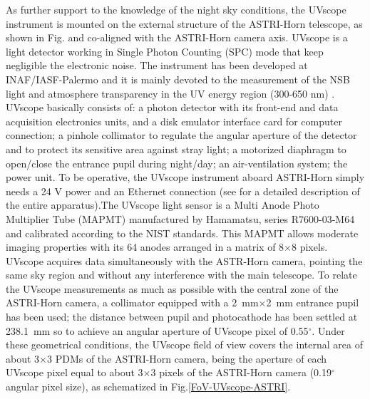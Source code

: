 As further support to the knowledge of the night sky conditions, the UVscope instrument is mounted on the external structure of the ASTRI-Horn telescope, as shown in Fig. and co-aligned with the ASTRI-Horn camera axis. UVscope is a light detector working in Single Photon Counting (SPC) mode that keep negligible the electronic noise. The instrument has been developed at INAF/IASF-Palermo and it is mainly devoted to the measurement of the NSB light and atmosphere transparency in the UV energy region (300-650 nm) \citep{Maccarone2011}. UVscope basically consists of: a photon detector with its front-end and data acquisition electronics units, and a disk emulator interface card for computer connection; a pinhole collimator to regulate the angular aperture of the detector and to protect its sensitive area against stray light; a motorized diaphragm to open/close the entrance pupil during night/day; an air-ventilation system; the power unit. To be operative, the UVscope instrument aboard ASTRI-Horn simply needs a 24 V power and an Ethernet connection (see \citep{Maccarone2020} for a detailed description of the entire apparatus).The UVscope light sensor is a Multi Anode Photo Multiplier Tube (MAPMT) manufactured by Hamamatsu, series R7600-03-M64 and calibrated according to the NIST standards. This MAPMT allows moderate imaging properties with its 64 anodes arranged in a matrix of 8${\times}$8 pixels. UVscope acquires data simultaneously with the ASTR-Horn camera, pointing the same sky region and without any interference with the main telescope.  To relate the UVscope measurements as much as possible with the central zone of the ASTRI-Horn camera, a collimator equipped with a 2~mm${\times}$2~mm entrance pupil has been used; the  distance between pupil and photocathode has been settled at 238.1~mm so to achieve an angular aperture of UVscope pixel of  0.55$^{\circ}$. Under these geometrical conditions, the UVscope field of view covers the internal area of about 3${\times}$3 PDMs of the ASTRI-Horn camera, being the aperture of each UVscope pixel equal to about 3${\times}$3 pixels of the ASTRI-Horn camera (0.19$^{\circ}$ angular pixel size), as schematized in Fig.\ref{FoV-UVscope-ASTRI}.

